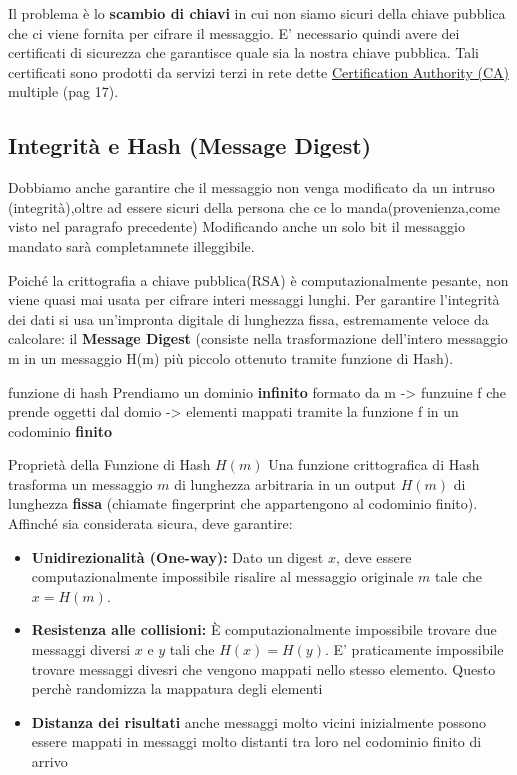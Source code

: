 \documentclass[a4paper,12pt]{report}
\begin{document}
\begin{notebox}{}
     Il problema è lo \textbf{scambio di chiavi} in cui non siamo sicuri della chiave pubblica che ci viene fornita per cifrare il messaggio. E' necessario quindi avere dei certificati di sicurezza che garantisce quale sia la nostra chiave pubblica.
Tali certificati sono prodotti da servizi terzi in rete dette \hyperref[subsec:cert-chiavi]{Certification Authority (CA)} multiple (pag 17).
\end{notebox}


\newpage
\subsection{Integrità e Hash (Message Digest)}
Dobbiamo anche garantire che il messaggio non venga modificato da un intruso (integrità),oltre ad essere sicuri della persona che ce lo manda(provenienza,come visto nel paragrafo precedente)
Modificando anche un solo bit il messaggio mandato sarà completamnete illeggibile.

Poiché la crittografia a chiave pubblica(RSA) è computazionalmente pesante, non viene quasi mai usata per cifrare interi messaggi lunghi. Per garantire l'integrità dei dati si usa un'impronta digitale di lunghezza fissa, estremamente veloce da calcolare: il \textbf{Message Digest} (consiste nella trasformazione dell'intero messaggio m in un messaggio H(m) più piccolo ottenuto tramite funzione di Hash).

\begin{esempiobox}{funzione di hash}
    Prendiamo un dominio \textbf{infinito} formato da m -> funzuine f che prende oggetti dal domio -> elementi mappati tramite la funzione f in un codominio \textbf{finito}
\end{esempiobox}

\begin{defbox}{Proprietà della Funzione di Hash $H(m)$}
Una funzione crittografica di Hash trasforma un messaggio $m$ di lunghezza arbitraria in un output $H(m)$ di lunghezza \textbf{fissa} (chiamate fingerprint che appartengono al codominio finito). Affinché sia considerata sicura, deve garantire:
\begin{itemize}
    \item \textbf{Unidirezionalità (One-way):} Dato un digest $x$, deve essere computazionalmente impossibile risalire al messaggio originale $m$ tale che $x = H(m)$.
    \item \textbf{Resistenza alle collisioni:} È computazionalmente impossibile trovare due messaggi diversi $x$ e $y$ tali che $H(x) = H(y)$. E' praticamente impossibile trovare messaggi divesri che vengono mappati nello stesso elemento. Questo perchè randomizza la mappatura degli elementi
    \item\textbf{Distanza dei risultati} anche messaggi molto vicini inizialmente possono essere mappati in messaggi molto distanti tra loro nel codominio finito di arrivo
\end{itemize}
\end{defbox}
\end{document}
